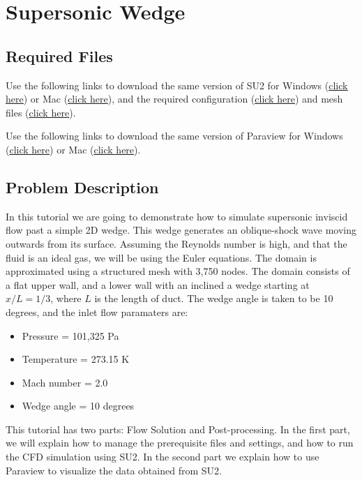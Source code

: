 \chapter{Supersonic Wedge}
\label{ch:Supersonic Wedge}
\section{Required Files}
\begin{su2note}
	Use the following links to download the same version of SU2 for Windows (\href{https://users.encs.concordia.ca/~bvermeir/book/executables/windows/SU2-v7.0.0-win64.zip}{\underline{click here}}) or Mac (\href{https://users.encs.concordia.ca/~bvermeir/book/executables/osx/SU2-v7.0.0-macos64.zip}{\underline{click here}}), and the required configuration (\href{https://gitlab.com/bvermeir/book-cfd/blob/master/tutorial/tut2_supersonic_wedge/inv_wedge_HLLC.cfg}{\underline{click here}}) and mesh files (\href{https://gitlab.com/bvermeir/book-cfd/blob/master/tutorial/tut2_supersonic_wedge/mesh_wedge_inv.su2}{\underline{click here}}).
\end{su2note}
\begin{paraviewnote}
	Use the following links to download the same version of Paraview for Windows (\href{https://users.encs.concordia.ca/~bvermeir/book/executables/windows/ParaView-5.4.0-Qt5-OpenGL2-Windows-64bit.exe}{\underline{click here}}) or Mac (\href{https://users.encs.concordia.ca/~bvermeir/book/executables/osx/ParaView-5.4.0-Qt5-OpenGL2-MPI-OSX10.8-64bit.dmg}{\underline{click here}}).
\end{paraviewnote}

\section{Problem Description}
In this tutorial we are going to demonstrate how to simulate supersonic inviscid flow past a simple 2D wedge. This wedge generates an oblique-shock wave moving outwards from its surface. Assuming the Reynolds number is high, and that the fluid is an ideal gas, we will be using the Euler equations. The domain is approximated using a structured mesh with 3,750 nodes. The domain consists of a flat upper wall, and a lower wall with an inclined a wedge starting at $x/L=1/3$, where $L$ is the length of duct. The wedge angle is taken to be 10 degrees, and the inlet flow paramaters are:
\begin{itemize}
    \item Pressure = 101,325 Pa
    \item Temperature = 273.15 K
    \item Mach number = 2.0
    \item Wedge angle = 10 degrees
\end{itemize}
This tutorial has two parts: Flow Solution and Post-processing. In the first part, we will explain how to manage the prerequisite files and settings, and how to run the CFD simulation using SU2. In the second part we explain how to use Paraview to visualize the data obtained from SU2.
